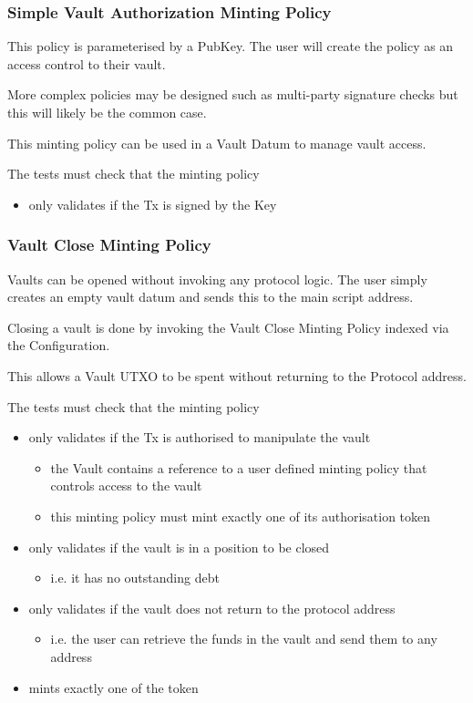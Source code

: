 \documentclass{article} %
\begin{document}
\subsubsection{Simple Vault Authorization Minting Policy}
This policy is parameterised by a PubKey. The user will create the policy as an access control to their vault.

More complex policies may be designed such as multi-party signature checks but this will likely be the common case.

This minting policy can be used in a Vault Datum to manage vault access.

The tests must check that the minting policy
\begin{itemize}
  \item only validates if the Tx is signed by the Key
\end{itemize}

\subsubsection{Vault Close Minting Policy}
Vaults can be opened without invoking any protocol logic. The user simply creates an empty vault datum and sends this to the main script address.

Closing a vault is done by invoking the Vault Close Minting Policy indexed via the Configuration.

This allows a Vault UTXO to be spent without returning to the Protocol address.

The tests must check that the minting policy
\begin{itemize}
  \item only validates if the Tx is authorised to manipulate the vault
  \begin{itemize}
    \item the Vault contains a reference to a user defined minting policy that controls access to the vault
    \item this minting policy must mint exactly one of its authorisation token
  \end{itemize}
  \item only validates if the vault is in a position to be closed
  \begin{itemize}
    \item i.e. it has no outstanding debt
  \end{itemize}
  \item only validates if the vault does not return to the protocol address
  \begin{itemize}
    \item i.e. the user can retrieve the funds in the vault and send them to any address
  \end{itemize}
  \item mints exactly one of the token
\end{itemize}
\end{document}
